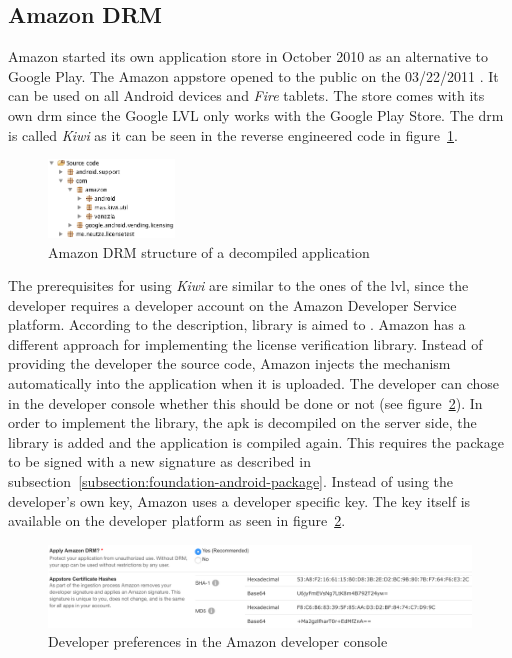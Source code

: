 \subsection{Amazon DRM} \label{section:license-amazon}
Amazon started its own application store in October 2010 \cite{amazonBeta} as an alternative to Google Play.
The Amazon appstore opened to the public on the 03/22/2011 \cite{amazonRelease}.
It can be used on all Android devices and \textit{Fire} tablets.
The store comes with its own \gls{drm} since the Google LVL only works with the Google Play Store.
The \gls{drm} is called \textit{Kiwi} as it can be seen in the reverse engineered code in figure~\ref{fig:amazonFolder}.
\newline
\begin{figure}[h]
    \centering
    \includegraphics[width=0.3\textwidth]{data/amazonFolder.png}
    \caption{Amazon DRM structure of a decompiled application}
    \label{fig:amazonFolder}
\end{figure}
The prerequisites for using \textit{Kiwi} are similar to the ones of the \gls{lvl}, since the developer requires a developer account on the Amazon Developer Service platform.
According to the description, library is aimed to \grqq \cite{amazonDeveloper}.
\newline
Amazon has a different approach for implementing the license verification library.
Instead of providing the developer the source code, Amazon injects the mechanism automatically into the application when it is uploaded.
The developer can chose in the developer console whether this should be done or not (see figure~\ref{fig:amazon}).
In order to implement the library, the \gls{apk} is decompiled on the server side, the library is added and the application is compiled again.
This requires the package to be signed with a new signature as described in subsection~\ref{subsection:foundation-android-package}.
Instead of using the developer's own key, Amazon uses a developer specific key.
The key itself is available on the developer platform as seen in figure~\ref{fig:amazon}. \cite{amazonDeveloper}
\newline
\begin{figure}[h]
    \centering
    \includegraphics[width=1\textwidth]{data/amazon.png}
    \caption{Developer preferences in the Amazon developer console \cite{amazonDeveloper}}
    \label{fig:amazon}
\end{figure}
